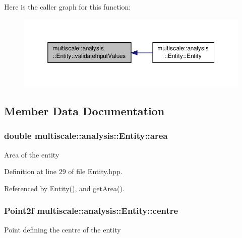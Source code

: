 Here is the caller graph for this function\-:\nopagebreak
\begin{figure}[H]
\begin{center}
\leavevmode
\includegraphics[width=350pt]{classmultiscale_1_1analysis_1_1Entity_afd09bf78874eb411c0940713948c4891_icgraph}
\end{center}
\end{figure}




\subsection{Member Data Documentation}
\hypertarget{classmultiscale_1_1analysis_1_1Entity_a7fad3c67bb46cc0f4ce1fb17ef3e66cc}{
\subsubsection[{area}]{\setlength{\rightskip}{0pt plus 5cm}double multiscale\-::analysis\-::\-Entity\-::area\hspace{0.3cm}{\ttfamily [private]}}}\label{classmultiscale_1_1analysis_1_1Entity_a7fad3c67bb46cc0f4ce1fb17ef3e66cc}
Area of the entity 

Definition at line 29 of file Entity.\-hpp.



Referenced by Entity(), and get\-Area().

\hypertarget{classmultiscale_1_1analysis_1_1Entity_ad226609174b21f71210161d29a16d4ef}{
\subsubsection[{centre}]{\setlength{\rightskip}{0pt plus 5cm}Point2f multiscale\-::analysis\-::\-Entity\-::centre\hspace{0.3cm}{\ttfamily [private]}}}\label{classmultiscale_1_1analysis_1_1Entity_ad226609174b21f71210161d29a16d4ef}
Point defining the centre of the entity 

